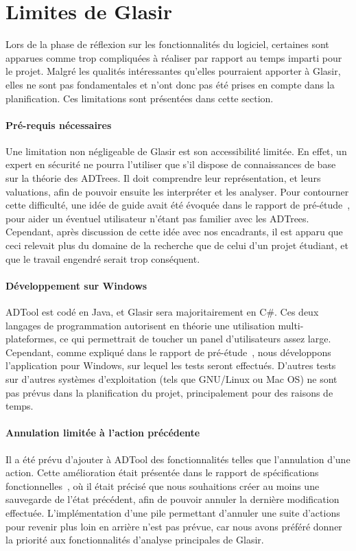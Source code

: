 \section{Limites de Glasir}
    \label{sec:limites}

    Lors de la phase de réflexion sur les fonctionnalités du logiciel, certaines sont apparues comme trop compliquées à réaliser par rapport au temps imparti pour le projet. Malgré les qualités intéressantes qu'elles pourraient apporter à Glasir, elles ne sont pas fondamentales et n'ont donc pas été prises en compte dans la planification. Ces limitations sont présentées dans cette section.

    \paragraph{Pré-requis nécessaires}

    Une limitation non négligeable de Glasir est son accessibilité limitée. En effet, un expert en sécurité ne pourra l'utiliser que s'il dispose de connaissances de base sur la théorie des ADTrees. Il doit comprendre leur représentation, et leurs valuations, afin de pouvoir ensuite les interpréter et les analyser. Pour contourner cette difficulté, une idée de \og guide \fg{} avait été évoquée dans le rapport de pré-étude~\cite{pre_etude}, pour aider un éventuel utilisateur n'étant pas familier avec les ADTrees. Cependant, après discussion de cette idée avec nos encadrants, il est apparu que ceci relevait plus du domaine de la recherche que de celui d'un projet étudiant, et que le travail engendré serait trop conséquent.

    \paragraph{Développement sur Windows}

    ADTool est codé en Java, et Glasir sera majoritairement en C\#. Ces deux langages de programmation autorisent en théorie une utilisation multi-plateformes, ce qui permettrait de toucher un panel d'utilisateurs assez large. Cependant, comme expliqué dans le rapport de pré-étude~\cite{pre_etude}, nous développons l'application pour Windows, sur lequel les tests seront effectués. D'autres tests sur d'autres systèmes d'exploitation (tels que GNU/Linux ou Mac OS) ne sont pas prévus dans la planification du projet, principalement pour des raisons de temps.

    \paragraph{Annulation limitée à l'action précédente}

    Il a été prévu d'ajouter à ADTool des fonctionnalités telles que l'annulation d'une action. Cette amélioration était présentée dans le rapport de spécifications fonctionnelles~\cite{spec_fonc}, où il était précisé que nous souhaitions créer au moins une sauvegarde de l'état précédent, afin de pouvoir annuler la dernière modification effectuée. L'implémentation d'une pile permettant d'annuler une suite d'actions pour revenir plus loin en arrière n'est pas prévue, car nous avons préféré donner la priorité aux fonctionnalités d'analyse principales de Glasir.